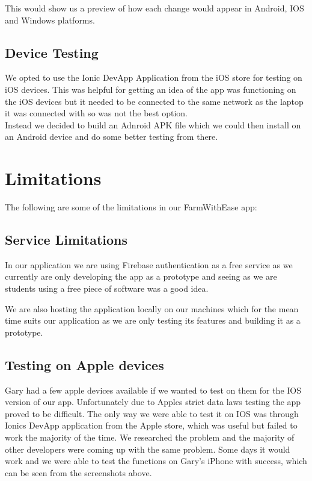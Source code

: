 \documentclass[12pt,a4paper,oneside,openany]{book}
\begin{document}
This would show us a preview of how each change would appear in Android, IOS and Windows platforms.\cite{serve}

\subsection{Device Testing}
We opted to use the Ionic DevApp Application from the iOS store for testing on iOS devices. This was helpful for getting an idea of the app was functioning on the iOS devices but it needed to be connected to the same network as the laptop it was connected with so was not the best option.\\

\noindent
Instead we decided to build an Adnroid APK file which we could then install on an Android device and do some better testing from there.

\section{Limitations}
The following are some of the limitations in our FarmWithEase app:

\subsection{Service Limitations}
In our application we are using Firebase authentication as a free service as we currently are only developing the app as a prototype and seeing as we are students using a free piece of software was a good idea. 

We are also hosting the application locally on our machines which for the mean time suits our application as we are only testing its features and building it as a prototype.

\subsection{Testing on Apple devices}
Gary had a few apple devices available if we wanted to test on them for the IOS version of our app. Unfortunately due to Apples strict data laws testing the app proved to be difficult. The only way we were able to test it on IOS was through Ionics DevApp application from the Apple store, which was useful but failed to work the majority of the time. We researched the problem and the majority of other developers were coming up with the same problem. Some days it would work and we were able to test the functions on Gary's iPhone with success, which can be seen from the screenshots above.
\end{document}
